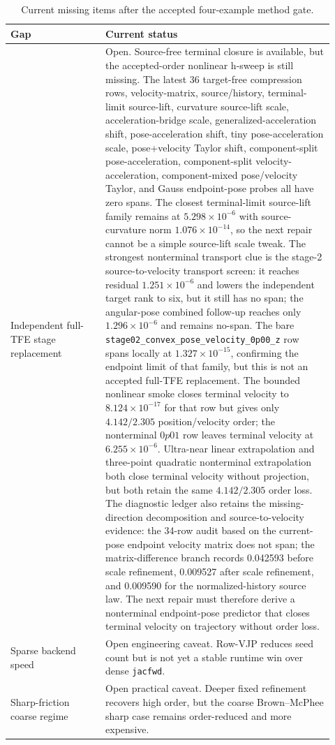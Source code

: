 \documentclass[11pt]{article}
\newcommand{\tfe}{TFE}
\begin{document}
\begin{table}[t]
\centering
\caption{Current missing items after the accepted four-example method gate.}
\label{tab:remaining}
\begin{tabular}{p{0.27\linewidth}p{0.65\linewidth}}
\toprule
Gap & Current status \\
\midrule
Independent full-\tfe{} stage replacement &
Open.  Source-free terminal closure is available, but the accepted-order
nonlinear h-sweep is still missing.  The latest 36 target-free compression
rows, velocity-matrix, source/history, terminal-limit source-lift, curvature
source-lift scale, acceleration-bridge scale, generalized-acceleration shift,
pose-acceleration shift, tiny pose-acceleration scale, pose+velocity Taylor
shift, component-split pose-acceleration, component-split
velocity-acceleration, component-mixed pose/velocity Taylor, and Gauss
endpoint-pose probes all have zero spans.  The
closest terminal-limit source-lift family remains at
$5.298\times10^{-6}$ with source-curvature norm $1.076\times10^{-14}$, so the
next repair cannot be a simple source-lift scale tweak.  The strongest
nonterminal transport clue is the stage-2 source-to-velocity transport screen:
it reaches residual $1.251\times10^{-6}$ and lowers the independent target
rank to six, but it still has no span; the angular-pose combined follow-up
reaches only $1.296\times10^{-6}$ and remains no-span.  The bare
\nolinkurl{stage02_convex_pose_velocity_0p00_z} row spans locally at
$1.327\times10^{-15}$, confirming the endpoint limit of that family, but this
is not an accepted full-\tfe{} replacement.  The bounded nonlinear smoke closes
terminal velocity to $8.124\times10^{-17}$ for that row but gives only
$4.142/2.305$ position/velocity order; the nonterminal $0p01$ row leaves
terminal velocity at $6.255\times10^{-6}$.  Ultra-near linear extrapolation
and three-point quadratic nonterminal extrapolation both close terminal
velocity without projection, but both retain the same $4.142/2.305$ order
loss.  The diagnostic ledger also retains the missing-direction decomposition
and source-to-velocity evidence: the 34-row audit based on the
current-pose endpoint velocity matrix does not span; the matrix-difference
branch records 0.042593 before scale refinement, 0.009527 after scale refinement, and 0.009590
for the normalized-history source law.  The next repair must therefore derive a nonterminal endpoint-pose
predictor that closes terminal velocity on trajectory without order loss. \\
Sparse backend speed &
Open engineering caveat.  Row-VJP reduces seed count but is not yet a stable
runtime win over dense \texttt{jacfwd}. \\
Sharp-friction coarse regime &
Open practical caveat.  Deeper fixed refinement recovers high order, but the
coarse Brown--McPhee sharp case remains order-reduced and more expensive. \\
\bottomrule
\end{tabular}
\end{table}
\end{document}
